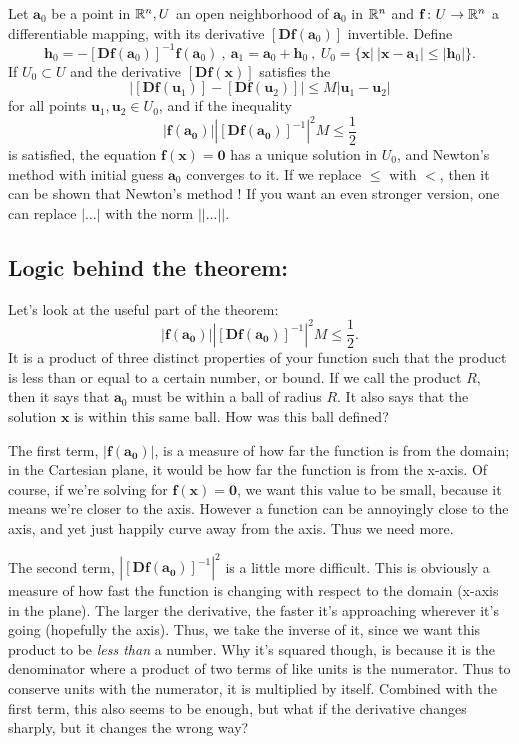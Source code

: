 \documentclass[12pt]{article}
\newcommand{\pt}[1]{\mathbf{#1}}
\renewcommand{\vec}[1]{\mathbf{#1}}
\newcommand{\df}[1]{[\mathbf{D}\vec{f}(#1)]}
\begin{document}
Let $\pt{a}_0$ be a point in $\Bbb{R}^n, U$ an open neighborhood of
$\pt{a}_0$ in $\Bbb{R}^n$ and $\vec{f}\colon U\rightarrow\Bbb{R}^n$ a
differentiable mapping, with its derivative $\df{\pt{a}_0}$
invertible. Define
\[
\vec{h}_0=-\df{\pt{a}_0}^{-1}\vec{f}(\pt{a}_0)\: ,\: \pt{a}_1=\pt{a}_0 + \vec{h}_0\: ,\: U_0 = \{\pt{x}|\: |\pt{x}-\pt{a}_1|\leq |\vec{h}_0|\}.
\]
If $U_0\subset U$ and the derivative $\df{\pt{x}}$ satisfies the
\[
|\df{\pt{u}_1} - \df{\pt{u}_2}|\leq M|\pt{u}_1-\pt{u}_2|
\]
for all points $\pt{u}_1,\pt{u}_2\in U_0$, and if the inequality
\[
\left|\vec{f}(\pt{a_0})\right|\left|\df{\pt{a_0}}^{-1}\right|^2M\leq\frac{1}{2}
\]
is satisfied, the equation $\vec{f}(\pt{x})=\vec{0}$ has a unique
solution in $U_0$, and Newton's method with initial guess $\pt{a}_0$
converges to it.  If we replace $\leq$ with $<$, then it can be shown
that Newton's method ! If you want an
even stronger version, one can replace $|...|$ with the norm
$||...||$.

\subsection*{Logic behind the theorem:} 
Let's look at the useful part of the theorem:
\[
\left|\vec{f}(\pt{a_0})\right|\left|\df{\pt{a_0}}^{-1}\right|^2M\leq\frac{1}{2}.
\]
It is a product of three distinct properties of your function such
that the product is less than or equal to a certain number, or
bound. If we call the product $R$, then it says that $\pt{a}_0$ must
be within a ball of radius $R$. It also says that the solution
$\pt{x}$ is within this same ball. How was this ball defined?

The first term, $|\vec{f}(\pt{a_0})|$, is a measure of how far the
function is from the domain; in the Cartesian plane, it would be how
far the function is from the x-axis. Of course, if we're solving for
$\vec{f}(\pt{x})=\vec{0}$, we want this value to be small, because it
means we're closer to the axis. However a function can be annoyingly
close to the axis, and yet just happily curve away from the axis. Thus
we need more.

The second term, $|\df{\pt{a_0}}^{-1}|^2$ is a little more
difficult. This is obviously a measure of how fast the function is
changing with respect to the domain (x-axis in the plane). The larger
the derivative, the faster it's approaching wherever it's going
(hopefully the axis). Thus, we take the inverse of it, since we want
this product to be \emph{less than} a number. Why it's squared though,
is because it is the denominator where a product of two terms of like
units is the numerator. Thus to conserve units with the numerator, it
is multiplied by itself. Combined with the first term, this also seems
to be enough, but what if the derivative changes sharply, but it
changes the wrong way?
\end{document}
